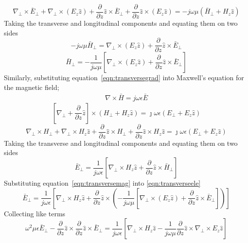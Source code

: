 \begin{dmath*}
\nabla_\bot\times\bar{E}_\bot + \nabla_\bot\times(E_z\hat{z}) + \frac{\partial}{\partial z}\hat{z}\times\bar{E}_\bot + \frac{\partial}{\partial z}\hat{z}\times(E_z\hat{z}) = -j\omega\mu(\bar{H}_\bot + H_z\hat{z})
\end{dmath*}
Taking the transverse and longitudinal components and equating them on two sides
\begin{dmath*}
-j\omega\mu\bar{H}_\bot = \nabla_\bot\times(E_z\hat{z}) + \frac{\partial}{\partial z}\hat{z}\times\bar{E}_\bot
\end{dmath*}
\begin{dmath}
\bar{H}_\bot = -\frac{1}{j\omega\mu} \left[\nabla_\bot\times(E_z\hat{z}) + \frac{\partial}{\partial z}\hat{z}\times\bar{E}_\bot\right]
\label{eqn:transversemag}
\end{dmath}
Similarly, substituting equation~\ref{eqn:transversegrad}  into Maxwell's equation for the magnetic field;
\begin{align*}
\nabla\times\bar{H} = j\omega\epsilon\bar{E}
\end{align*}
\begin{dmath*}
\left[ \nabla_\bot + \frac{\partial}{\partial z}\hat{z} \right] \times (H_\bot + H_z \hat{z}) = \jmath \omega\epsilon (E_\bot + E_z \hat{z})
\end{dmath*}
\begin{dmath*}
\nabla_\bot\times H_\bot + \nabla_\bot\times H_z \hat{z} +  \frac{\partial}{\partial z}\hat{z}\times H_\bot + \frac{\partial}{\partial z}\hat{z}\times H_z \hat{z} = \jmath \omega\epsilon (E_\bot + E_z \hat{z})
\end{dmath*}
Taking the transverse and longitudinal components and equating them on two sides
\begin{dmath}
\bar{E}_\bot = \frac{1}{j\omega\epsilon} \left[\nabla_\bot\times H_z\hat{z} + \frac{\partial}{\partial z}\hat{z}\times\bar{H}_\bot\right]
\label{eqn:transverseele}
\end{dmath}
Substituting equation~\ref{eqn:transversemag} into \ref{eqn:transverseele}
\begin{dmath*}
\bar{E}_\bot = \frac{1}{j\omega\epsilon} \left[\nabla_\bot\times H_z\hat{z} + \frac{\partial}{\partial z}\hat{z}\times \left( -\frac{1}{j\omega\mu} \left[\nabla_\bot\times(E_z\hat{z}) + \frac{\partial}{\partial z}\hat{z}\times\bar{E}_\bot\right] \right)\right] 
\end{dmath*}
Collecting like terms
\begin{dmath}
\omega^2\mu\epsilon\bar{E}_\bot-\frac{\partial}{\partial z}\hat{z}\times\frac{\partial}{\partial z}\hat{z}\times\bar{E}_\bot = \frac{1}{j\omega\epsilon} \left[\nabla_\bot\times H_z\hat{z} - \frac{1}{j\omega\mu}\frac{\partial}{\partial z}\hat{z}\times\nabla_\bot\times E_z \hat{z} \right]
\label{eqn:electricfieldinwg}
\end{dmath}
